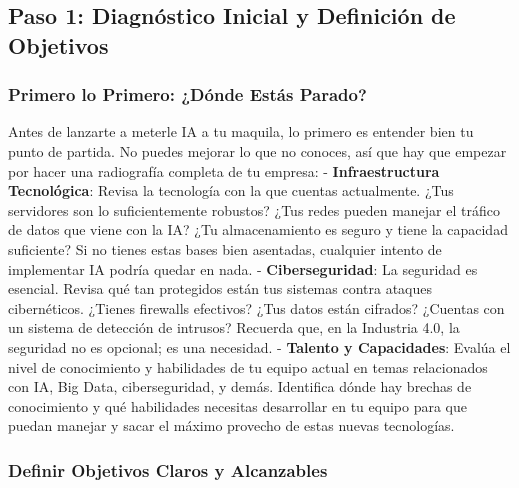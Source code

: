 \documentclass[
  letterpaper,
]{book}
\begin{document}
\subsection{Paso 1: Diagnóstico Inicial y Definición de
Objetivos}\label{paso-1-diagnuxf3stico-inicial-y-definiciuxf3n-de-objetivos}

\subsubsection{\texorpdfstring{\textbf{Primero lo Primero: ¿Dónde Estás
Parado?}}{Primero lo Primero: ¿Dónde Estás Parado?}}\label{primero-lo-primero-duxf3nde-estuxe1s-parado}

Antes de lanzarte a meterle IA a tu maquila, lo primero es entender bien
tu punto de partida. No puedes mejorar lo que no conoces, así que hay
que empezar por hacer una radiografía completa de tu empresa: -
\textbf{Infraestructura Tecnológica}: Revisa la tecnología con la que
cuentas actualmente. ¿Tus servidores son lo suficientemente robustos?
¿Tus redes pueden manejar el tráfico de datos que viene con la IA? ¿Tu
almacenamiento es seguro y tiene la capacidad suficiente? Si no tienes
estas bases bien asentadas, cualquier intento de implementar IA podría
quedar en nada. - \textbf{Ciberseguridad}: La seguridad es esencial.
Revisa qué tan protegidos están tus sistemas contra ataques
cibernéticos. ¿Tienes firewalls efectivos? ¿Tus datos están cifrados?
¿Cuentas con un sistema de detección de intrusos? Recuerda que, en la
Industria 4.0, la seguridad no es opcional; es una necesidad. -
\textbf{Talento y Capacidades}: Evalúa el nivel de conocimiento y
habilidades de tu equipo actual en temas relacionados con IA, Big Data,
ciberseguridad, y demás. Identifica dónde hay brechas de conocimiento y
qué habilidades necesitas desarrollar en tu equipo para que puedan
manejar y sacar el máximo provecho de estas nuevas tecnologías.

\subsubsection{\texorpdfstring{\textbf{Definir Objetivos Claros y
Alcanzables}}{Definir Objetivos Claros y Alcanzables}}\label{definir-objetivos-claros-y-alcanzables}
\end{document}
